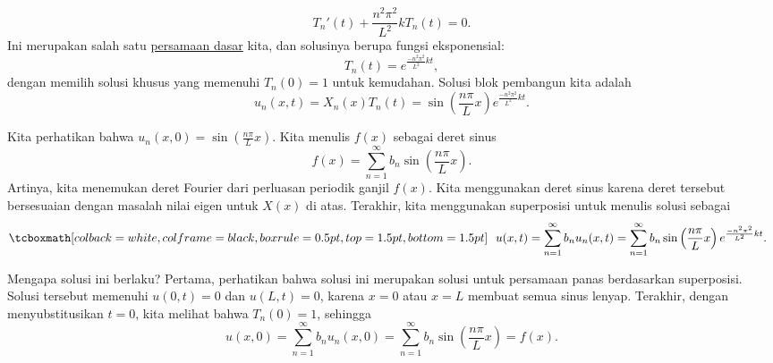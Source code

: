 \begin{equation*}
T_n'(t) + \frac{n^2 \pi^2}{L^2} k T_n(t) = 0 .
\end{equation*}
Ini merupakan salah satu
\hyperref[subsection:fourfundamental]{persamaan dasar} kita,
dan solusinya berupa
fungsi eksponensial:
\begin{equation*}
T_n(t) = e^{\frac{-n^2 \pi^2}{L^2} k t} ,
\end{equation*}
dengan memilih solusi khusus
yang memenuhi $T_n(0) = 1$ untuk kemudahan.
Solusi blok pembangun kita adalah
\begin{equation*}
u_n(x,t) = X_n(x)T_n(t) =
\sin \left( \frac{n \pi}{L} x \right)
e^{\frac{-n^2 \pi^2}{L^2} k t} .
\end{equation*}

Kita perhatikan bahwa $u_n(x,0) = \sin \left( \frac{n \pi}{L} x \right)$.
Kita menulis $f(x)$ sebagai deret sinus
\begin{equation*}
f(x) = \sum_{n=1}^\infty b_n \sin \left(\frac{n \pi}{L}  x \right) .
\end{equation*}
Artinya, kita menemukan deret Fourier dari perluasan periodik ganjil $f(x)$.
Kita menggunakan deret sinus karena deret tersebut bersesuaian dengan masalah nilai eigen untuk
$X(x)$ di atas.
Terakhir, kita menggunakan superposisi untuk menulis solusi sebagai
\begin{equation*}
\mybxbg{~~
u(x,t) = 
\sum_{n=1}^\infty
b_n
u_n(x,t)
=
\sum_{n=1}^\infty
b_n
\sin \left( \frac{n \pi}{L}  x \right)
e^{\frac{-n^2 \pi^2}{L^2} k t} .
~~}
\end{equation*}

Mengapa solusi ini berlaku?  Pertama, perhatikan bahwa solusi ini merupakan solusi untuk
persamaan panas berdasarkan superposisi.  Solusi tersebut memenuhi $u(0,t) = 0$
dan $u(L,t) = 0$, karena $x=0$ atau $x=L$ membuat semua sinus lenyap.
Terakhir, dengan menyubstitusikan $t=0$, kita melihat bahwa $T_n(0) = 1$, sehingga
\begin{equation*}
u(x,0) = 
\sum_{n=1}^\infty
b_n
u_n(x,0)
=
\sum_{n=1}^\infty
b_n
\sin \left( \frac{n \pi}{L} x \right)
=
f(x) .
\end{equation*}

